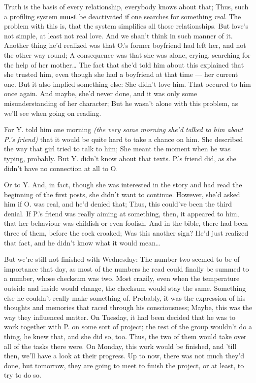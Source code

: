 Truth is the basis of every relationship, everybody knows about that; Thus, such a profiling system \textbf{must} be deactivated if one searches for something \emph{real}. The problem with this is, that the system simplifies all those relationships. 
But love's not simple, at least not real love. 
And we shan't think in such manner of it. 
Another thing he'd realized was that O.'s former boyfriend had left her, and not the other way round; A consequence was that she was alone, crying, searching for the help of her mother\ldots
The fact that she'd told him about this explained that she trusted him, even though she had a boyfriend at that time --- her current one. But it also implied something else: She didn't love him. 
That occured to him once again.
And maybe, she'd never done, and it was only some misunderstanding of her character; But he wasn't alone with this problem, as we'll see when going on reading.

For Y. told him one morning \emph{(the very same morning she'd talked to him about P.'s friend)} that it would be quite hard to take a chance on him. She described the way that girl tried to talk to him; She meant the moment when he was typing, probably. But Y. didn't know about that texts. 
P.'s friend did, as she didn't have no connection at all to O.

Or to Y. And, in fact, though she was interested in the story and had read the beginning of the first posts, she didn't want to continue. However, she'd asked him if O. was real, and he'd denied that; Thus, this could've been the third denial. If P.'s friend was really aiming at something, then, it appeared to him, that her behaviour was childish or even foolish. 
And in the bible, there had been three of them, before the cock croaked; Was this another sign?
He'd just realized that fact, and he didn't know what it would mean\ldots

But we're still not finished with Wednesday: The number two seemed to be of importance that day, as most of the numbers he read could finally be summed to a number, whose checksum was two. Most crazily, even when the temperature outside and inside would change, the checksum would stay the same. 
Something else he couldn't really make something of. 
Probably, it was the expression of his thoughts and memories that raced through his consciousness; Maybe, this was the way they influenced matter. 
On Tuesday, it had been decided that he was to work together with P. on some sort of project; the rest of the group wouldn't do a thing, he knew that, and she did so, too. 
Thus, the two of them would take over all of the tasks there were. 
On Monday, this work would be finished, and 'till then, we'll have a look at their progress. Up to now, there was not much they'd done, but tomorrow, they are going to meet to finish the project, or at least, to try to do so.

